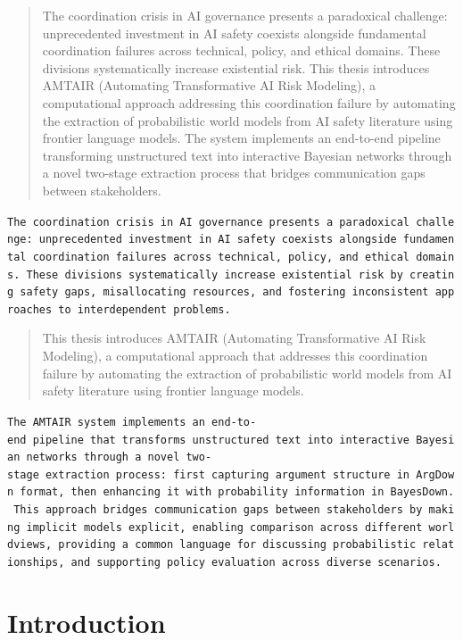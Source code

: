 \documentclass[
  11pt,
  letterpaper,
]{book}
\begin{document}

\begin{quote}
The coordination crisis in AI governance presents a paradoxical
challenge: unprecedented investment in AI safety coexists alongside
fundamental coordination failures across technical, policy, and ethical
domains. These divisions systematically increase existential risk. This
thesis introduces AMTAIR (Automating Transformative AI Risk Modeling), a
computational approach addressing this coordination failure by
automating the extraction of probabilistic world models from AI safety
literature using frontier language models. The system implements an
end-to-end pipeline transforming unstructured text into interactive
Bayesian networks through a novel two-stage extraction process that
bridges communication gaps between stakeholders.
\end{quote}

\texttt{The\ coordination\ crisis\ in\ AI\ governance\ presents\ a\ paradoxical\ challenge:\ unprecedented\ investment\ in\ AI\ safety\ coexists\ alongside\ fundamental\ coordination\ failures\ across\ technical,\ policy,\ and\ ethical\ domains.\ These\ divisions\ systematically\ increase\ existential\ risk\ by\ creating\ safety\ gaps,\ misallocating\ resources,\ and\ fostering\ inconsistent\ approaches\ to\ interdependent\ problems.}

\begin{quote}
This thesis introduces AMTAIR (Automating Transformative AI Risk
Modeling), a computational approach that addresses this coordination
failure by automating the extraction of probabilistic world models from
AI safety literature using frontier language models.
\end{quote}

\texttt{The\ AMTAIR\ system\ implements\ an\ end-to-end\ pipeline\ that\ transforms\ unstructured\ text\ into\ interactive\ Bayesian\ networks\ through\ a\ novel\ two-stage\ extraction\ process:\ first\ capturing\ argument\ structure\ in\ ArgDown\ format,\ then\ enhancing\ it\ with\ probability\ information\ in\ BayesDown.\ This\ approach\ bridges\ communication\ gaps\ between\ stakeholders\ by\ making\ implicit\ models\ explicit,\ enabling\ comparison\ across\ different\ worldviews,\ providing\ a\ common\ language\ for\ discussing\ probabilistic\ relationships,\ and\ supporting\ policy\ evaluation\ across\ diverse\ scenarios.}


\chapter{Introduction}\label{sec-introduction}
\end{document}
